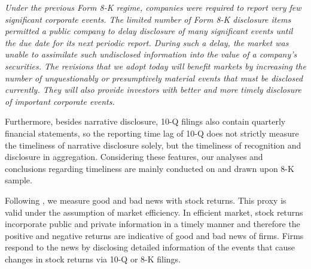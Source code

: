 \documentclass[a4paper]{article}
\begin{document}
\begin{spacing}{2}
\begin{singlespace}
	\indent \textit{Under the previous Form 8-K regime, companies were required to report very few significant corporate events. The limited number of Form 8-K disclosure items permitted a public company to delay disclosure of many significant events until the due date for its next periodic report. During such a delay, the market was unable to assimilate such undisclosed information into the value of a company's securities. The revisions that we adopt today will benefit markets by increasing the number of unquestionably or presumptively material events that must be disclosed currently. They will also provide investors with better and more timely disclosure of important corporate events.}
	\begin{flushright}
		\cite<Final Rule: Additional Form 8-K Disclosure Requirements and Acceleration of Filing Date,>[]{secFinalRuleAdditional2004}
	\end{flushright}
\end{singlespace}

Furthermore, besides narrative disclosure, 10-Q filings also contain quarterly financial statements, so the reporting time lag of 10-Q does not strictly measure the timeliness of narrative disclosure solely, but the timeliness of recognition and disclosure in aggregation. Considering these features, our analyses and conclusions regarding timeliness are mainly conducted on and drawn upon 8-K sample.

Following , we measure good and bad news with stock returns. This proxy is valid under the assumption of market efficiency. In efficient market, stock returns incorporate public and private information in a timely manner and therefore the positive and negative returns are indicative of good and bad news of firms. %
Firms respond to the news by disclosing detailed information of the events that cause changes in stock returns via 10-Q or 8-K filings.


\end{spacing}
\end{document}
